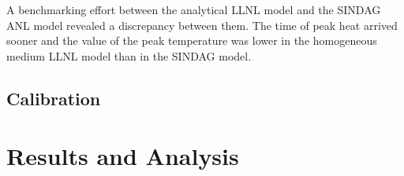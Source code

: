 \documentclass{anstrans}
\begin{document}
A benchmarking effort between the analytical \gls{LLNL} model and the 
\gls{SINDAG} \gls{ANL} model revealed a discrepancy between them. The time of 
peak heat arrived sooner and the value of the peak temperature was lower in the 
homogeneous medium \gls{LLNL} model than in the \gls{SINDAG} model. 





\subsection{Calibration}

\section{Results and Analysis}


\end{document}
